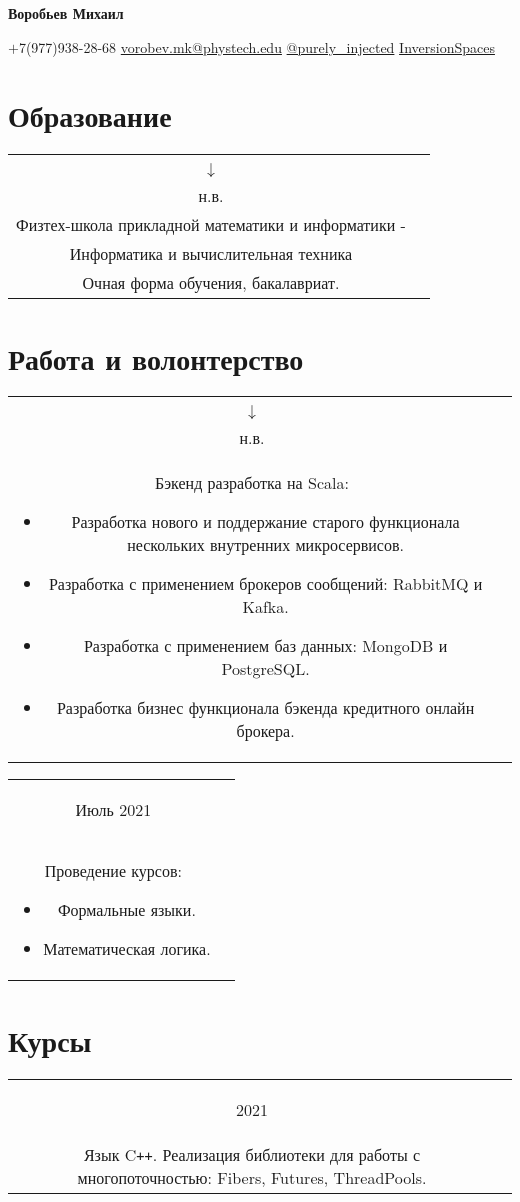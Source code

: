 \documentclass{article}
\makeatletter
\renewcommand{\maketitle}{
    \Huge
    \begin{center}
        \textbf{Воробьев Михаил}
    \end{center}

    \small
    \begin{center}
    \faMobile \hspace{0.1cm} $\boldsymbol{+}$7(977)938-28-68 
    \hfill
    \faEnvelope \hspace{0.1cm} \href{mailto:vorobev.mk@phystech.edu}{vorobev.mk@phystech.edu}
    \hfill
    \faPaperPlane \hspace{0.1cm} \href{https://t.me/purely_injected}{@purely\_injected}
    \hfill
    \faGithub \hspace{0.1cm} \href{https://github.com/InversionSpaces}{InversionSpaces}
    \end{center}
}
\newcommand{\entry}[3]{
	\begin{tabular}{ c | c }
    \begin{minipage}{0.05\linewidth}
    	\begin{center}
    		#1
    	\end{center}
    \end{minipage} 
    &
    \begin{minipage}{0.85\linewidth}
        \textbf{#2} \\ \footnotesize{#3}
    \end{minipage}
    \end{tabular}
}
\newcommand{\interval}[2]{
	#1 \\ $\downarrow$ \\ #2
}
\makeatother
\begin{document}
    \maketitle
    \small
    
    \section{Образование}
        \entry {\interval{2019}{н.в.}}
        {Московский физико-технический институт - \\
         Физтех-школа прикладной математики и информатики - \\
         Информатика и вычислительная техника}
        {Очная форма обучения, бакалавриат.}

    \section{Работа и волонтерство}
        \entry {\interval{Фев. 2021}{н.в.}}
        {Тинькофф - Отдел кредитных и брокерских систем - Младший специалист}
        {Бэкенд разработка на Scala: 
        	\begin{itemize}
        		\item Разработка нового и поддержание старого функционала нескольких внутренних микросервисов.
        		\item Разработка с применением брокеров сообщений: RabbitMQ и Kafka.
        		\item Разработка с применением баз данных: MongoDB и PostgreSQL.
        		\item Разработка бизнес функционала бэкенда кредитного онлайн брокера.
        	\end{itemize}
        }
        
        \vspace{.1cm}
        
        \entry {Июль 2021}
        {Летняя школа Слон в Пущино - Волонтер-преподаватель}
        {Проведение курсов:
        	\begin{itemize}
        		\item Формальные языки.
        		\item Математическая логика.
        	\end{itemize}
    	}  

    \section{Курсы}
    \entry {2021
        }
        {МФТИ - Теория и практика многопоточной синхронизации }
        { Язык C\texttt{++}. Реализация библиотеки для работы с многопоточностью: Fibers, Futures, ThreadPools.  }
    
\end{document}

